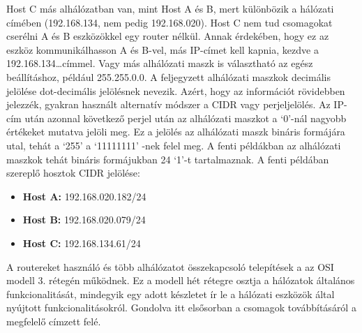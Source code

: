Host C más alhálózatban van, mint Host A és B, mert különbözik a hálózati címében (192.168.134, nem pedig 192.168.020).
Host C nem tud csomagokat cserélni A és B eszközökkel egy router nélkül. 
Annak érdekében, hogy ez az eszköz kommunikálhasson A és B-vel, más IP-címet kell kapnia,
kezdve a 192.168.134\ldots címmel. 
Vagy más alhálózati maszk is választható az egész beállításhoz,
például 255.255.0.0.
A feljegyzett alhálózati maszkok decimális jelölése dot-decimális jelölésnek nevezik.
Azért, hogy az információt rövidebben jelezzék, gyakran
használt alternatív módszer a CIDR vagy perjeljelölés.
Az IP-cím után azonnal következő perjel után az
alhálózati maszkot a `0'-nál nagyobb értékeket mutatva jelöli meg.
Ez a jelölés az alhálózati maszk bináris formájára utal, tehát a `255' a `11111111' -nek felel meg.
A fenti példákban az alhálózati maszkok tehát bináris formájukban 24
`1'-t tartalmaznak. 
A fenti példában szereplő hosztok CIDR jelölése:
\begin{itemize}
    \item \textbf{Host A:} 192.168.020.182/24
    \item \textbf{Host B:} 192.168.020.079/24
    \item \textbf{Host C:} 192.168.134.61/24
\end{itemize}
A routereket használó és több alhálózatot összekapcsoló telepítések a
az OSI modell 3. rétegén működnek. Ez a modell hét rétegre osztja a
hálózatok általános funkcionalitását, mindegyik egy adott készletet ír le a hálózati
eszközök által nyújtott funkcionalitásokról. Gondolva itt elsősorban a csomagok továbbításáról a
megfelelő címzett felé. 

